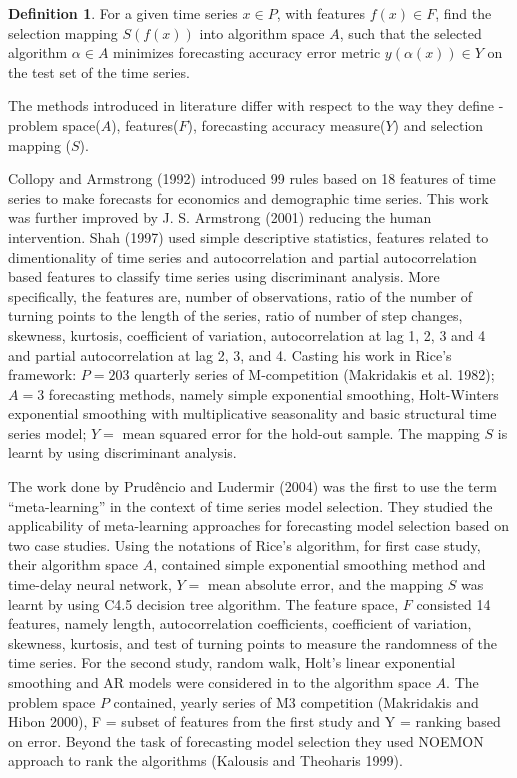 \documentclass[11pt,]{article}
\theoremstyle{definition}
\newtheorem{definition}{Definition}[section]
\theoremstyle{definition}
\theoremstyle{definition}
\theoremstyle{remark}
\begin{document}
\begin{definition}
\label{def2}
For a given time series $x \in P$, with features $f(x) \in F$, find the selection mapping $S(f(x))$ into algorithm space $A$, such that the selected algorithm $\alpha \in A$ minimizes forecasting accuracy error metric $y(\alpha(x)) \in Y$ on the test set of the time series.
\end{definition}

The methods introduced in literature differ with respect to the way they
define - problem space(\(A\)), features(\(F\)), forecasting accuracy
measure(\(Y\)) and selection mapping (\(S\)).

Collopy and Armstrong (1992) introduced 99 rules based on 18 features of
time series to make forecasts for economics and demographic time series.
This work was further improved by J. S. Armstrong (2001) reducing the
human intervention. Shah (1997) used simple descriptive statistics,
features related to dimentionality of time series and autocorrelation
and partial autocorrelation based features to classify time series using
discriminant analysis. More specifically, the features are, number of
observations, ratio of the number of turning points to the length of the
series, ratio of number of step changes, skewness, kurtosis, coefficient
of variation, autocorrelation at lag 1, 2, 3 and 4 and partial
autocorrelation at lag 2, 3, and 4. Casting his work in Rice's
framework: \(P=203\) quarterly series of M-competition (Makridakis et
al. 1982); \(A=3\) forecasting methods, namely simple exponential
smoothing, Holt-Winters exponential smoothing with multiplicative
seasonality and basic structural time series model; \(Y=\) mean squared
error for the hold-out sample. The mapping \(S\) is learnt by using
discriminant analysis.

The work done by Prudêncio and Ludermir (2004) was the first to use the
term ``meta-learning'' in the context of time series model selection.
They studied the applicability of meta-learning approaches for
forecasting model selection based on two case studies. Using the
notations of Rice's algorithm, for first case study, their algorithm
space \(A\), contained simple exponential smoothing method and
time-delay neural network, \(Y=\) mean absolute error, and the mapping
\(S\) was learnt by using C4.5 decision tree algorithm. The feature
space, \(F\) consisted 14 features, namely length, autocorrelation
coefficients, coefficient of variation, skewness, kurtosis, and test of
turning points to measure the randomness of the time series. For the
second study, random walk, Holt's linear exponential smoothing and AR
models were considered in to the algorithm space \(A\). The problem
space \(P\) contained, yearly series of M3 competition (Makridakis and
Hibon 2000), F = subset of features from the first study and Y = ranking
based on error. Beyond the task of forecasting model selection they used
NOEMON approach to rank the algorithms (Kalousis and Theoharis 1999).
\end{document}
